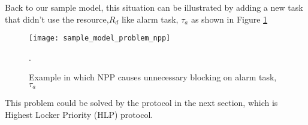 Back to our sample model, this situation can be illustrated by adding a new task that didn't use the resource,$ R_{d}$ like alarm task, $\tau_{a}$ as shown in Figure \ref{fig:sample_model_problem_npp}

 
\begin{figure}[h]
    \centering
    \texttt{[image: sample\_model\_problem\_npp]}
    \caption{Example in which NPP causes unnecessary blocking on alarm task, $ \tau_{a} $ }.
    \label{fig:sample_model_problem_npp}
\end{figure}

 This problem could be solved by the protocol in the next section, which is Highest Locker Priority (HLP) protocol.